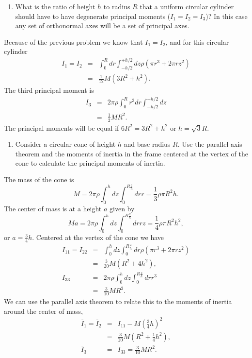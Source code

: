 \documentclass[letterpaper,11pt]{article}
\begin{document}
\begin{enumerate}[resume]
 \item What is the ratio of height $h$ to radius $R$ that a uniform circular cylinder should have to have degenerate principal moments ($I_1 = I_2 = I_3$)?  In this case any set of orthonormal axes will be a set of principal axes.
\end{enumerate}
Because of the previous problem we know that $I_1 = I_2$, and for this circular cylinder
\begin{eqnarray*}
 I_1 = I_2 & = & \int_0^R dr \int_{-h/2}^{+h/2} dz \rho \left( \pi r^3 + 2 \pi r z^2 \right) \\
 & = & \frac{1}{12} M (3 R^2 + h^2).
\end{eqnarray*}
The third principal moment is
\begin{eqnarray*}
 I_3 & = & 2 \pi \rho \int_0^R r^3 dr \int_{-h/2}^{+h/2} dz \\
 & = & \frac{1}{2} M R^2.
\end{eqnarray*}
The principal moments will be equal if $6 R^2 = 3 R^2 + h^2$ or $h = \sqrt{3} R$.

\begin{enumerate}[resume]
 \item Consider a circular cone of height $h$ and base radius $R$.  Use the parallel axis theorem and the moments of inertia in the frame centered at the vertex of the cone to calculate the principal moments of inertia.
\end{enumerate}
The mass of the cone is
\begin{equation*}
 M = 2 \pi \rho \int_0^h dz \int_0^{R \frac{z}{h}} dr r = \frac{1}{3} \rho \pi R^2 h.
\end{equation*}
The center of mass is at a height $a$ given by
\begin{equation*}
 M a = 2 \pi \rho \int_0^h dz \int_0^{R \frac{z}{h}} dr r z = \frac{1}{4} \rho \pi R^2 h^2,
\end{equation*}
or $a = \frac{3}{4} h$.
Centered at the vertex of the cone we have
\begin{eqnarray*}
 I_{11} = I_{22} & = & \int_0^h dz \int_0^{R \frac{z}{h}} dr \rho \left( \pi r^3 + 2 \pi r z^2 \right) \\
 & = & \frac{3}{20} M (R^2 + 4 h^2), \\
 I_{33} & = & 2 \pi \rho \int_0^h dz \int_0^{R \frac{z}{h}} dr r^3 \\
 & = & \frac{3}{10} M R^2.
\end{eqnarray*}
We can use the parallel axis theorem to relate this to the moments of inertia around the center of mass,
\begin{eqnarray*}
 \bar{I}_1 = \bar{I}_2 & = & I_{11} - M \left(\frac{3}{4} h\right)^2 \\
 & = & \frac{3}{20} M \left(R^2 + \frac{1}{4} h^2 \right), \\
 \bar{I}_3 & = & I_{33} = \frac{3}{10} M R^2.
\end{eqnarray*}
\end{document}
